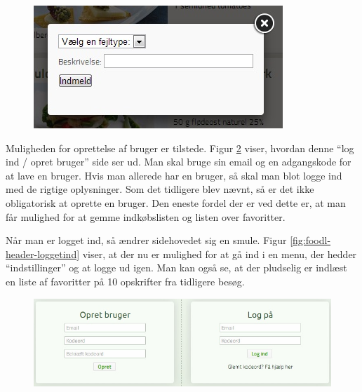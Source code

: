 \begin{figure}[H]
	\centering
	\includegraphics[scale=0.7]{billeder/foodl/fejlrapportering.jpg}
	\label{fig:foodl-fejlrapportering}
\end{figure}

Muligheden for oprettelse af bruger er tilstede. Figur \ref{fig:foodl-opret} viser, hvordan denne ``log ind / opret bruger'' side ser ud. Man skal bruge sin email og en adgangskode for at lave en bruger. Hvis man allerede har en bruger, så skal man blot logge ind med de rigtige oplysninger. Som det tidligere blev nævnt, så er det ikke obligatorisk at oprette en bruger. Den eneste fordel der er ved dette er, at man får mulighed for at gemme indkøbslisten og listen over favoritter. 

Når man er logget ind, så ændrer sidehovedet sig en smule. Figur \ref{fig:foodl-header-loggetind} viser, at der nu er mulighed for at gå ind i en menu, der hedder ``indstillinger'' og at logge ud igen. Man kan også se, at der pludselig er indlæst en liste af favoritter på 10 opskrifter fra tidligere besøg.

\begin{figure}[H]
	\centering
	\includegraphics[scale=0.7]{billeder/foodl/login-opret.jpg}
	\label{fig:foodl-opret}
\end{figure}

